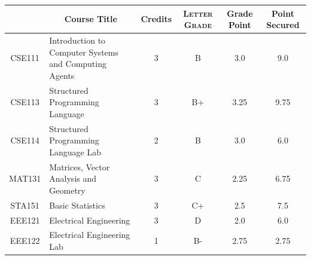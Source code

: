 \documentclass[11pt]{article}
\newcommand*{\numtwo}[1]{\pgfmathprintnumber[
                    fixed, precision=2, fixed zerofill=true]{#1}}
\begin{document}
                \begin{center}
                    \renewcommand{\arraystretch}{1.08}
                    
                \begin{tabular}{|c|l|c|>{\scshape}c|c|c|}
                \hline  \rule[-1ex]{0pt}{3.5ex} {\centering{\bf Course Code}} &  \multicolumn{1}{c|}{\textbf{Course Title}}  & {\bf Credits} & {\bf Letter Grade} & {\bf Grade Point} & {\bf Point Secured}  \\ 
                \hline   CSE111 &  Introduction to Computer Systems and Computing Agents		 & 3 & B & 3.0 & 9.0 \\ %
                \hline   CSE113 &  Structured Programming Language		 & 3 & B+ & 3.25 & 9.75 \\ %
                \hline   CSE114 &  Structured Programming Language Lab		 & 2 & B & 3.0 & 6.0 \\ %
                \hline   MAT131 &  Matrices, Vector Analysis and Geometry		 & 3 & C & 2.25 & 6.75 \\ %
                \hline   STA151 &  Basic Statistics		 & 3 & C+ & 2.5 & 7.5 \\ %
                \hline   EEE121 &  Electrical Engineering		 & 3 & D & 2.0 & 6.0 \\ %
                \hline   EEE122 &  Electrical Engineering Lab		 & 1 & B- & 2.75 & 2.75 \\ %

\hline                %
                \end{tabular}
                \end{center}
                \renewcommand{\arraystretch}{1.03}
\end{document}

